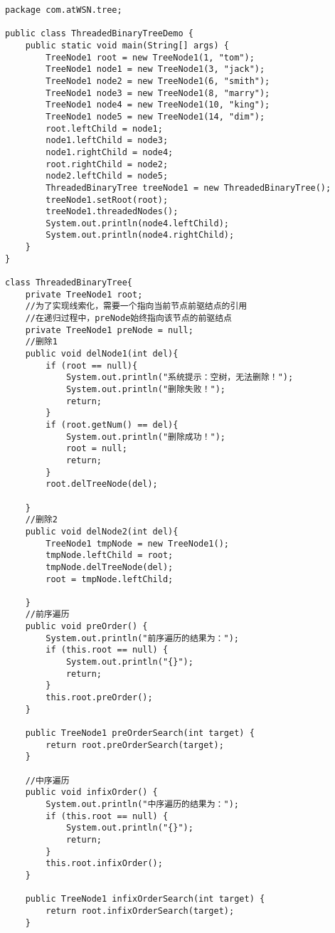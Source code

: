 \documentclass[a4paper]{report}
\begin{document}
\begin{lstlisting}
package com.atWSN.tree;

public class ThreadedBinaryTreeDemo {
    public static void main(String[] args) {
        TreeNode1 root = new TreeNode1(1, "tom");
        TreeNode1 node1 = new TreeNode1(3, "jack");
        TreeNode1 node2 = new TreeNode1(6, "smith");
        TreeNode1 node3 = new TreeNode1(8, "marry");
        TreeNode1 node4 = new TreeNode1(10, "king");
        TreeNode1 node5 = new TreeNode1(14, "dim");
        root.leftChild = node1;
        node1.leftChild = node3;
        node1.rightChild = node4;
        root.rightChild = node2;
        node2.leftChild = node5;
        ThreadedBinaryTree treeNode1 = new ThreadedBinaryTree();
        treeNode1.setRoot(root);
        treeNode1.threadedNodes();
        System.out.println(node4.leftChild);
        System.out.println(node4.rightChild);
    }
}

class ThreadedBinaryTree{
    private TreeNode1 root;
    //为了实现线索化，需要一个指向当前节点前驱结点的引用
    //在递归过程中，preNode始终指向该节点的前驱结点
    private TreeNode1 preNode = null;
    //删除1
    public void delNode1(int del){
        if (root == null){
            System.out.println("系统提示：空树，无法删除！");
            System.out.println("删除失败！");
            return;
        }
        if (root.getNum() == del){
            System.out.println("删除成功！");
            root = null;
            return;
        }
        root.delTreeNode(del);

    }
    //删除2
    public void delNode2(int del){
        TreeNode1 tmpNode = new TreeNode1();
        tmpNode.leftChild = root;
        tmpNode.delTreeNode(del);
        root = tmpNode.leftChild;

    }
    //前序遍历
    public void preOrder() {
        System.out.println("前序遍历的结果为：");
        if (this.root == null) {
            System.out.println("{}");
            return;
        }
        this.root.preOrder();
    }

    public TreeNode1 preOrderSearch(int target) {
        return root.preOrderSearch(target);
    }

    //中序遍历
    public void infixOrder() {
        System.out.println("中序遍历的结果为：");
        if (this.root == null) {
            System.out.println("{}");
            return;
        }
        this.root.infixOrder();
    }

    public TreeNode1 infixOrderSearch(int target) {
        return root.infixOrderSearch(target);
    }


\end{lstlisting}
\end{document}
